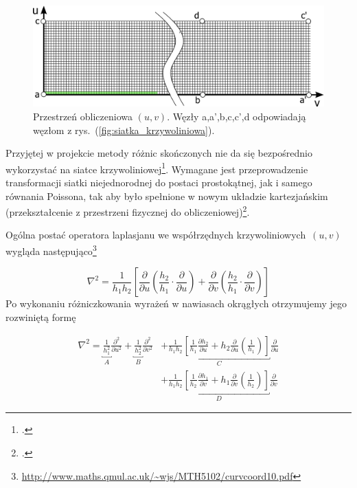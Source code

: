 \begin{figure}[H]
	\centering
	\includegraphics[width=\linewidth]{Rysunki/siatka_prostokatna.png}
	\caption{Przestrzeń obliczeniowa $(u,v)$. Węzły \textsf{a,a',b,c,c',d} odpowiadają węzłom z rys.~(\ref{fig:siatka_krzywoliniowa}). 
	\label{fig:siatka_obliczeniowa}}
\end{figure}

\indent Przyjętej w projekcie metody różnic skończonych nie da się bezpośrednio wykorzystać na siatce krzywoliniowej\footcite{Anderson, s. 170}. Wymagane jest przeprowadzenie transformacji siatki niejednorodnej do postaci prostokątnej, jak i samego równania Poissona, tak aby było spełnione w nowym układzie kartezjańskim (przekształcenie z przestrzeni fizycznej do obliczeniowej)\footcite{Blazek, s. 36}. 

\indent\newline Ogólna postać operatora laplasjanu we współrzędnych krzywoliniowych~$(u,v)$ wygląda  następująco\footnote{\url{http://www.maths.qmul.ac.uk/~wjs/MTH5102/curvcoord10.pdf}}

\begin{equation}
\nabla^2  = \frac{1}{h_1h_2}\left[\frac{\partial}{\partial u}\left(\frac{h_2}{h_1}\cdot\frac{\partial}{\partial u}\right)+\frac{\partial}{\partial v}\left(\frac{h_2}{h_1}\cdot\frac{\partial}{\partial v}\right) \right]
\end{equation}
\newline
\noindent Po wykonaniu różniczkowania wyrażeń w nawiasach okrągłych otrzymujemy jego rozwiniętą formę


\begin{equation} 
\begin{split}
\nabla^2
= 
\underbracket{\frac{1}{h_1^2}}_{A}\frac{\partial^2}{\partial u^2}
+ 
\underbracket{\frac{1}{h_2^2}}_{B}\frac{\partial^2}{\partial v^2}
& + 
\underbracket{\frac{1}{h_1h_2}\left[\frac{1}{h_1}\frac{\partial h_2}{\partial u} +  h_2\frac{\partial}{\partial u}\left(\frac{1}{h_1}\right) \right]}_{C}\frac{\partial}{\partial u}
 \\ & +
\underbracket{\frac{1}{h_1h_2}\left[ \frac{1}{h_2}\frac{\partial h_1}{\partial v}+h_1\frac{\partial}{\partial v}\left(\frac{1}{h_2}\right)\right]}_{D}\frac{\partial}{\partial v}
\end{split}
\label{eq:laplasjan_1}
\end{equation}

